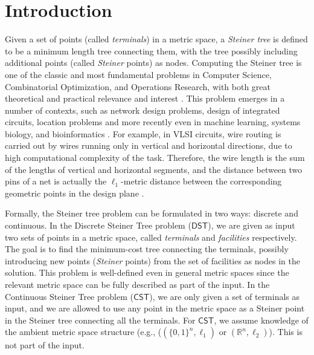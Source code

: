 \documentclass{article}\providecommand{\DeclareRedundantLanguages}[2]{}\usepackage[a4paper,margin=20mm]{geometry}
\newcommand{\R}{\mathbb{R}}
\newcommand{\1}{\textbf{1}}
\newcommand{\cst}{$\mathsf{CST}$\xspace}
\newcommand{\dst}{$\mathsf{DST}$\xspace}
\begin{document}
 

\section{Introduction}


Given a set of points (called \emph{terminals}) in a metric space, a \emph{Steiner tree} is defined to be a minimum length tree connecting them, with the tree possibly including additional points (called \emph{Steiner} points) as nodes. Computing the Steiner
tree is one of the classic and most fundamental problems in Computer Science, Combinatorial Optimization, and Operations Research, with both great theoretical and practical relevance and interest \cite{ljubic2021solving}. 
This problem
emerges in a number of contexts, such as network design problems, design of integrated circuits, location problems \cite{cheng2013steiner,cho2001steiner,hwang1992steiner,lengauer2012combinatorial,resende2008handbook,noormohammadpour2017dccast}  and
more recently even in machine learning, systems biology, and bioinformatics \cite{backes2012integer,ideker2002discovering,russakovsky2010steiner, tuncbag2016network}.
For example, in VLSI circuits, wire routing is carried out by wires running only in vertical and horizontal directions, due to high computational complexity of the task. Therefore, the wire length is the sum of the lengths of vertical and horizontal segments, and the distance between two pins of a net is actually the $\ell_1$-metric  distance between the corresponding geometric points in the design plane \cite{sherwani2012algorithms}. 

Formally, the Steiner tree problem can be formulated in two ways: discrete and continuous. In the Discrete Steiner Tree problem (\dst), we are given as input two sets of points in a metric space, called \emph{terminals} and \emph{facilities} respectively. The goal is to find the minimum-cost tree connecting the terminals, possibly introducing new points (\emph{Steiner} points) from the set of facilities as nodes in the solution. This problem is well-defined even in general metric spaces since the relevant metric space can be fully described as part of the input. In the Continuous Steiner Tree problem (\cst), we are only given a set of terminals as input, and we are allowed to use any point in the metric space as a Steiner point in the Steiner tree connecting all the terminals. For \cst, we assume knowledge of the ambient metric space structure (e.g., ($(\{0,1\}^n, \ell_1)$ or $(\R^n, \ell_2)$). This is not part of the input.
\end{document}
